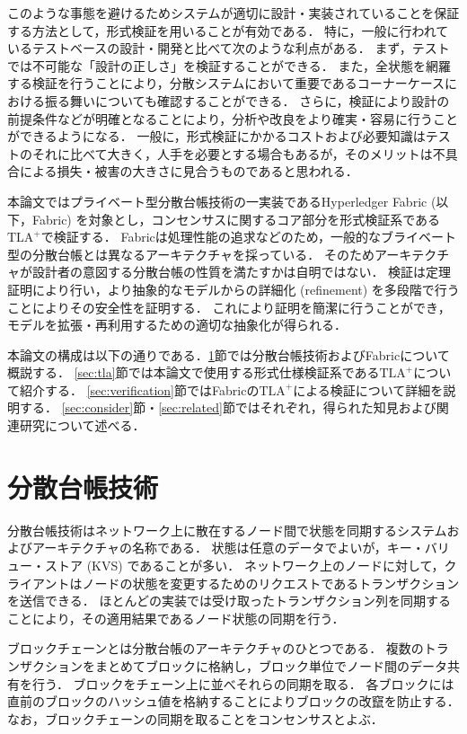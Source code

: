 \documentclass{fose2019}           %
\newcommand{\TLA}{$\text{TLA}^{+}$}
\begin{document}
このような事態を避けるためシステムが適切に設計・実装されていることを保証する方法として，形式検証を用いることが有効である．
特に，一般に行われているテストベースの設計・開発と比べて次のような利点がある．
まず，テストでは不可能な「設計の正しさ」を検証することができる．
また，全状態を網羅する検証を行うことにより，分散システムにおいて重要であるコーナーケースにおける振る舞いについても確認することができる．
さらに，検証により設計の前提条件などが明確となることにより，分析や改良をより確実・容易に行うことができるようになる．
一般に，形式検証にかかるコストおよび必要知識はテストのそれに比べて大きく，人手を必要とする場合もあるが，そのメリットは不具合による損失・被害の大きさに見合うものであると思われる．

本論文ではプライベート型分散台帳技術の一実装であるHyperledger Fabric (以下，Fabric) を対象とし，コンセンサスに関するコア部分を形式検証系である\TLA で検証する．
Fabricは処理性能の追求などのため，一般的なブライベート型の分散台帳とは異なるアーキテクチャを採っている．
そのためアーキテクチャが設計者の意図する分散台帳の性質を満たすかは自明ではない．
検証は定理証明により行い，より抽象的なモデルからの詳細化 (refinement) を多段階で行うことによりその安全性を証明する．
これにより証明を簡潔に行うことができ，モデルを拡張・再利用するための適切な抽象化が得られる．

本論文の構成は以下の通りである．\ref{sec:dlt}節では分散台帳技術およびFabricについて概説する．
\ref{sec:tla}節では本論文で使用する形式仕様検証系である\TLA について紹介する．
\ref{sec:verification}節ではFabricの\TLA による検証について詳細を説明する．
\ref{sec:consider}節・\ref{sec:related}節ではそれぞれ，得られた知見および関連研究について述べる．

\section{分散台帳技術}\label{sec:dlt}
分散台帳技術はネットワーク上に散在するノード間で状態を同期するシステムおよびアーキテクチャの名称である．
状態は任意のデータでよいが，キー・バリュー・ストア (KVS) であることが多い．
ネットワーク上のノードに対して，クライアントはノードの状態を変更するためのリクエストであるトランザクションを送信できる．
ほとんどの実装では受け取ったトランザクション列を同期することにより，その適用結果であるノード状態の同期を行う．

ブロックチェーンとは分散台帳のアーキテクチャのひとつである．
複数のトランザクションをまとめてブロックに格納し，ブロック単位でノード間のデータ共有を行う．
ブロックをチェーン上に並べそれらの同期を取る．
各ブロックには直前のブロックのハッシュ値を格納することによりブロックの改竄を防止する．
なお，ブロックチェーンの同期を取ることをコンセンサスとよぶ．
\end{document}
